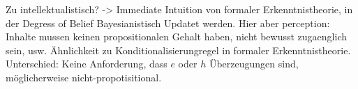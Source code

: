 \documentclass[12pt, handout]{beamer}
\begin{document}
\begin{frame}
  Zu intellektualistisch? -> Immediate Intuition von formaler
  Erkenntnistheorie, in der Degress of Belief Bayesianistisch Updatet
  werden. Hier aber perception: Inhalte mussen keinen propositionalen
  Gehalt haben, nicht bewusst zugaenglich sein, usw.  Ähnlichkeit zu
  Konditionalisierungregel in formaler Erkenntnistheorie. Unterschied:
  Keine Anforderung, dass $e$ oder $h$ Überzeugungen sind,
  möglicherweise nicht-propotisitional.
\end{frame}
\end{document}
